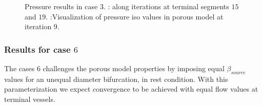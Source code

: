 \documentclass[a4paper, 11pt]{article} %
\begin{document}
\begin{figure}[hbtp]
\begin{center}
\caption{Pressure results in case 3. \protect{}: along iterations at terminal segments $15$ and $19$. \protect{}:Visualization of pressure iso values in porous model at iteration $9$.}
\label{fig:prcase3}
\end{center}
\end{figure}

\subsubsection{Results for case $6$}

The cases $6$ challenges the porous model properties by imposing equal $\beta_{source}$ values for an unequal diameter bifurcation, in rest condition. With this parameterization we expect convergence to be achieved with equal flow values at terminal vessels.
\end{document}
